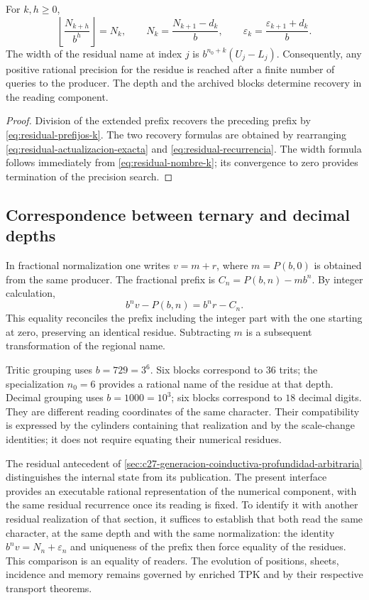 \begin{corollary}
\label{cor:residual-recuperacion}
For \(k,h\geq0\),
\[
 \left\lfloor\frac{N_{k+h}}{b^h}\right\rfloor=N_k,
 \qquad N_k=\frac{N_{k+1}-d_k}{b},
 \qquad \varepsilon_k=\frac{\varepsilon_{k+1}+d_k}{b}.
\]
The width of the residual name at index \(j\) is
\(b^{n_0+k}(U_j-L_j)\). Consequently, any positive rational precision
for the residue is reached after a finite number of queries to the
producer. The depth and the archived blocks determine recovery
in the reading component.
\end{corollary}
\begin{proof}
Division of the extended prefix recovers the preceding prefix by
\eqref{eq:residual-prefijos-k}. The two recovery formulas are
obtained by rearranging \eqref{eq:residual-actualizacion-exacta} and
\eqref{eq:residual-recurrencia}. The width formula follows immediately from
\eqref{eq:residual-nombre-k}; its convergence to zero provides
termination of the precision search.
\end{proof}

\subsection{Correspondence between ternary and decimal depths}
\label{subsec:residual-bases}

In fractional normalization one writes \(v=m+r\), where
\(m=P(b,0)\) is obtained from the same producer. The fractional prefix is
\(C_n=P(b,n)-mb^n\). By integer calculation,
\[
 b^n v-P(b,n)=b^n r-C_n.
\]
This equality reconciles the prefix including the integer part with the one
starting at zero, preserving an identical residue. Subtracting \(m\)
is a subsequent transformation of the regional name.

Tritic grouping uses \(b=729=3^6\). Six blocks correspond to
\(36\) trits; the specialization \(n_0=6\) provides a rational
name of the residue at that depth. Decimal grouping uses
\(b=1000=10^3\); six blocks correspond to \(18\) decimal digits.
They are different reading coordinates of the same character. Their compatibility
is expressed by the cylinders containing that realization and by the
scale-change identities; it does not require equating their numerical residues.

The residual antecedent of
\cref{sec:c27-generacion-coinductiva-profundidad-arbitraria} distinguishes the
internal state from its publication. The present interface provides an
executable rational representation of the numerical component, with the same
residual recurrence once its reading is fixed. To identify it with another
residual realization of that section, it suffices to establish that both read the same
character, at the same depth and with the same normalization: the identity
\(b^n v=N_n+\varepsilon_n\) and uniqueness of the prefix then force
equality of the residues. This comparison is an equality of readers.
The evolution of positions, sheets, incidence and memory remains governed
by enriched TPK and by their respective transport theorems.

